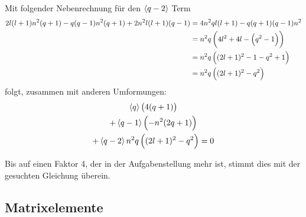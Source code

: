 Mit folgender Nebenrechnung für den $\left\langle q-2 \right\rangle$ Term
\begin{align*}
		2l(l+1)n^2(q+1) - q (q-1) n^2 (q+1) + 2 n^2 l(l+1) (q-1)
		&= 4n^2 q l(l+1) - q(q+1)(q-1) n^2 \\
		&= n^2 q \del{4l^2 + 4l - \del{q^2 - 1}} \\
		&= n^2 q \del{(2l+1)^2 - 1 - q^2 + 1} \\
		&= n^2 q \del{(2l+1)^2 - q^2} \\
\end{align*}
folgt, zusammen mit anderen Umformungen:
\begin{gather*}
	\bracket q
	\del{
		4(q+1)
	} \\
	+
	\bracket{q-1}
	\del{
		-n^2 (2q+1)
	} \\
	+
	\bracket{q-2}
	n^2 q
	\del{
		(2l+1)^2 - q^2
	}
	= 0
\end{gather*}

Bis auf einen Faktor 4, der in der Aufgabenstellung mehr ist, stimmt dies mit
der gesuchten Gleichung überein.

\subsection{Matrixelemente}

\fehlt


\IfFileExists{\bibliographyfile}{
}{}



